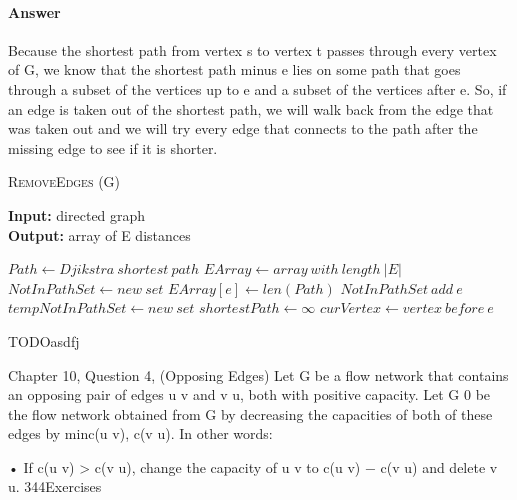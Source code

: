 \documentclass{article}
\begin{document}
\paragraph{Answer}
Because the shortest path from vertex s to vertex t passes through every vertex
of G, we know that the shortest path minus e lies on some path that goes through
a subset of the vertices up to e and a subset of the vertices after e. So, if
an edge is taken out of the shortest path, we will walk back from the edge that was
taken out and we will try every edge that connects to the path after the missing
edge to see if it is shorter.

\begin{algorithm} \caption{\textsc{RemoveEdges} (G)}\label{alg:seb}
    {\bf Input:} directed graph\\
    {\bf Output:} array of E distances
    \begin{algorithmic}[1]
        \State$Path \gets Djikstra\ shortest\ path$
        \State$EArray \gets array\ with\ length\ |E|$
        \State$NotInPathSet \gets new\ set$
                \State$EArray[e] \gets len(Path)$
            \Else{}
                \State$NotInPathSet\ add\ e$
            \EndIf{}
        \EndFor{}
            \State$tempNotInPathSet \gets new\ set$
            \State$shortestPath \gets \infty$
            \State$curVertex \gets vertex\ before\ e$

                \EndIf{}



            \EndFor{}



        \EndFor{}

    \end{algorithmic}
\end{algorithm}

            TODOasdfj

\collab{\todo{}}
\nextprob{}

Chapter 10, Question 4, (Opposing Edges)
Let G be a flow network that contains an opposing pair of edges u  v and
v  u, both with positive capacity. Let G 0 be the flow network obtained from G
by decreasing the capacities of both of these edges by min{c(u  v), c(v  u)}.
In other words:

• If c(u  v) > c(v  u), change the capacity of u  v to c(u  v) − c(v  u)
and delete v  u.
344Exercises
\end{document}
